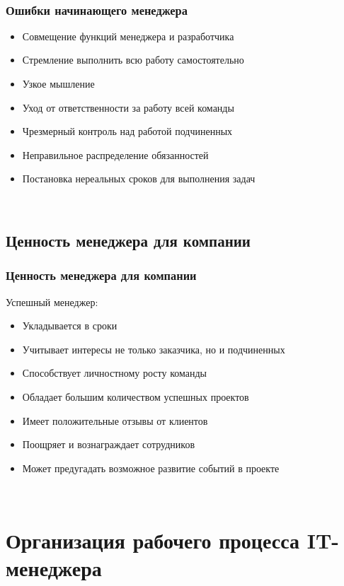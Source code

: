 \documentclass{../industrial-development}
\begin{document}
{{{{{{{{{{{{{{{~\cite{How_to_be_a_good_IT-manager}



\begin{frame} \frametitle{Ошибки начинающего менеджера}
\begin{itemize}	
		\item Совмещение функций менеджера и разработчика	
		\item Стремление выполнить всю работу самостоятельно
	 	\item Узкое мышление
	 	\item Уход от ответственности за работу всей команды
		\item Чрезмерный контроль над работой подчиненных
	 	\item Неправильное распределение обязанностей
	 	\item Постановка нереальных сроков для выполнения задач
 \end{itemize}
\end{frame}
\lecturenotes

~\cite{How_to_be_a_good_IT-manager}


\subsection{Ценность менеджера для компании}
\begin{frame} \frametitle{Ценность менеджера для компании}
 \begin{block}{Успешный менеджер:}
\begin{itemize}
  \item Укладывается в сроки
  \item Учитывает интересы не только заказчика, но и подчиненных 
  \item Способствует личностному росту команды
  \item Обладает большим количеством успешных проектов
  \item Имеет положительные отзывы от клиентов
  \item Поощряет и вознаграждает сотрудников
  \item Может предугадать возможное развитие событий в проекте

  \end{itemize}
 \end{block}
\end{frame}
\lecturenotes


~\cite{How_to_be_a_good_IT-manager}

\section{Организация рабочего процесса IT-менеджера}

}}}}}}}}}}}}}}}
\end{document}
